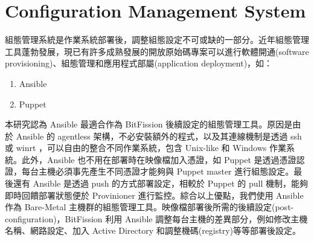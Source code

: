 \section{Configuration Management System}
組態管理系統是作業系統部署後，調整組態設定不可或缺的一部分。近年組態管理工具蓬勃發展，現已有許多成熟發展的開放原始碼專案可以進行軟體開通(software provisioning)、組態管理和應用程式部屬(application deployment)，如：
\begin{enumerate}
\item Ansible\cite{ansible}
\item Puppet\cite{puppet}
\end{enumerate}
本研究認為 Ansible 最適合作為 BitFission 後續設定的組態管理工具。原因是由於 Ansible 的 agentless 架構，不必安裝額外的程式，以及其連線機制是透過 ssh 或 winrt ，可以自由的整合不同作業系統，包含 Unix-like 和 Windows 作業系統。此外，Ansible 也不用在部署時在映像檔加入憑證，如 Puppet 是透過憑證認證，每台主機必須事先產生不同憑證才能夠與 Puppet master 進行組態設定。最後還有 Ansible 是透過 push 的方式部署設定，相較於 Puppet 的 pull 機制，能夠即時回饋部署狀態便於 Provinioner 進行監控。綜合以上優點，我們使用 Ansible 作為 Bare-Metal 主機群的組態管理工具。映像檔部署後所需的後續設定(post-configuration)，BitFission 利用 Ansible 調整每台主機的差異部分，例如修改主機名稱、網路設定、加入 Active Directory 和調整機碼(registry)等等部署後設定。


